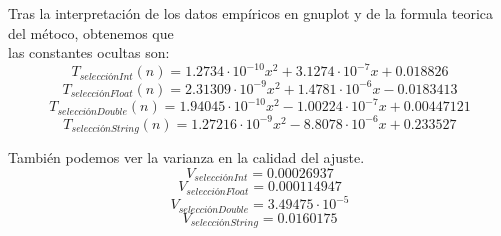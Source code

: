 \documentclass[11pt]{article}
\begin{document}
Tras la interpretación de los datos empíricos en gnuplot y de la formula teorica del métoco, obtenemos que \\
las constantes ocultas son:
\begin{equation*}
    T_{selecciónInt}(n)=1.2734 \cdot 10^{-10}x^{2}+3.1274 \cdot 10^{-7}x+0.018826
\end{equation*}
\begin{equation*}
    T_{selecciónFloat}(n)=2.31309 \cdot 10^{-9}x^{2}+1.4781 \cdot 10^{-6}x-0.0183413 
\end{equation*}
\begin{equation*}
    T_{selecciónDouble}(n)=1.94045 \cdot 10^{-10}x^{2}-1.00224 \cdot 10^{-7}x+0.00447121 
\end{equation*}
\begin{equation*}
    T_{selecciónString}(n)=1.27216 \cdot 10^{-9}x^{2}-8.8078 \cdot 10^{-6}x+0.233527 
\end{equation*}

También podemos ver la varianza en la calidad del ajuste. 
\begin{equation*}
    V_{selecciónInt}=0.00026937
\end{equation*}
\begin{equation*}
    V_{selecciónFloat}=0.000114947
\end{equation*}
\begin{equation*}
    V_{selecciónDouble}=3.49475 \cdot 10^{-5}
\end{equation*}
\begin{equation*}
    V_{selecciónString}=0.0160175
\end{equation*}
\end{document}

